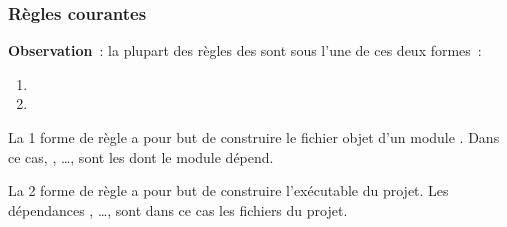 \begin{frame}[fragile]
\frametitle{Règles courantes}
{\bf Observation}~: la plupart des règles des  sont sous
l'une de ces deux formes~:
\medskip

\begin{enumerate}
\item
{}
\medskip

\item
{}
\end{enumerate}
\bigskip

La 1\iere{} forme de règle a pour but de construire le fichier objet
d'un module . Dans ce cas,
, \dots,  sont les  dont le module
 dépend.
\bigskip

La 2\ieme{} forme de règle a pour but de construire l'exécutable 
du projet. Les dépendances , \dots,  sont dans ce
cas les fichiers  du projet.
\end{frame}

